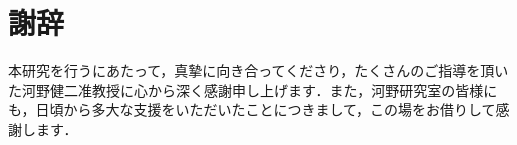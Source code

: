 \section*{謝辞}
本研究を行うにあたって，真摯に向き合ってくださり，たくさんのご指導を頂いた河野健二准教授に心から深く感謝申し上げます．また，河野研究室の皆様にも，日頃から多大な支援をいただいたことにつきまして，この場をお借りして感謝します．